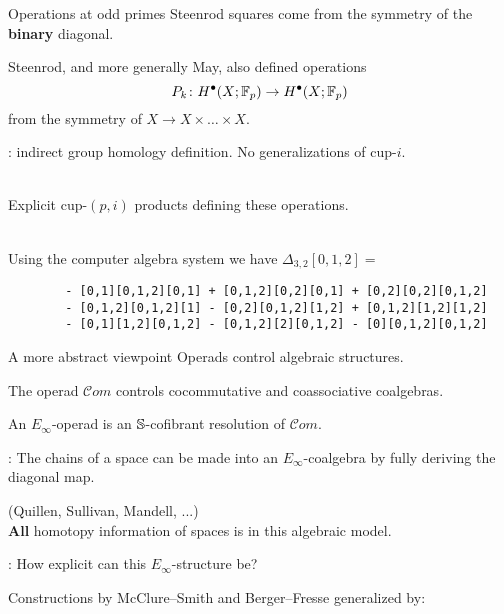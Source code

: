 
\begin{frame}[fragile]{Operations at odd primes}
	\pause
	Steenrod squares come from the symmetry of the \textbf{binary} diagonal.

	\medskip\pause
	Steenrod, and more generally May, also defined operations
	\[
	P_k \colon H^\bullet(X; {\mathbb{F}_p}) \to H^\bullet(X; {\mathbb{F}_p})
	\]
	from the symmetry of $X \to X \times \dots \times X$.

	\medskip\pause
	: indirect group homology definition.
	No generalizations of cup-$i$.

	\bigskip\pause
	 \\
	Explicit cup-$(p,i)$ products defining these operations.

	\medskip\pause
	 \\
	Using the computer algebra system  we have $\Delta_{3,2}[0,1,2] = $

	\begin{verbatim}
		- [0,1][0,1,2][0,1] + [0,1,2][0,2][0,1] + [0,2][0,2][0,1,2]
		- [0,1,2][0,1,2][1] - [0,2][0,1,2][1,2] + [0,1,2][1,2][1,2]
		- [0,1][1,2][0,1,2] - [0,1,2][2][0,1,2] - [0][0,1,2][0,1,2]
	\end{verbatim}
\end{frame}

\begin{frame}{A more abstract viewpoint}
	\pause
	Operads control algebraic structures.

	\bigskip\pause
	The operad $\mathcal{C}om$ controls cocommutative and coassociative coalgebras.

	\bigskip\pause
	An $E_\infty$-operad is an $\mathbb{S}$-cofibrant resolution of $\mathcal{C}om$.


	\bigskip\pause
	:
	The chains of a space can be made into an $E_\infty$-coalgebra by fully deriving the diagonal map.

	\bigskip\pause
	 (Quillen, Sullivan, Mandell, ...) \\
	\textbf{All} homotopy information of spaces is in this algebraic model.

	\bigskip\pause
	: How explicit can this $E_\infty$-structure be?

	\bigskip\pause
	Constructions by McClure--Smith and Berger--Fresse generalized by:
\end{frame}

